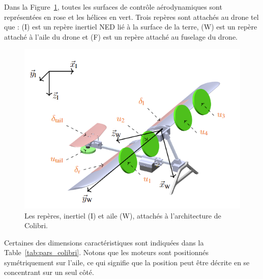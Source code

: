 Dans la Figure~\ref{fig:world_body}, toutes les surfaces de contrôle aérodynamiques sont représentées en rose et les hélices en vert. Trois repères sont attachés au drone tel que : (I) est un repère inertiel NED lié à la surface de la terre, (W) est un repère attaché à l'aile du drone et (F) est un repère attaché au fuselage du drone.



\begin{figure}[ht!]
\centering
    \includegraphics[width=0.6\columnwidth,angle=0,trim={0 0 0 0.5cm},clip]{figures/wold_body.png}
    \caption{Les repères, inertiel (I) et aile (W), attachés à l'architecture de Colibri.}
    \label{fig:world_body}
\end{figure}

Certaines des dimensions caractéristiques sont indiquées dans la Table~\ref{tab:pars_colibri}. Notons que les moteurs sont positionnés symétriquement sur l'aile, ce qui signifie que la position peut être décrite en se concentrant sur un seul côté. 

